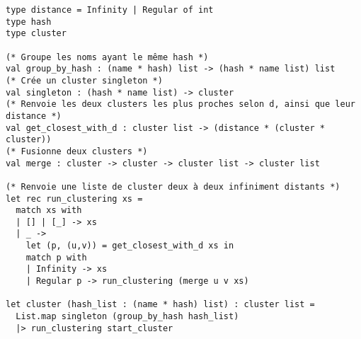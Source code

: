 \begin{verbatim}
type distance = Infinity | Regular of int
type hash
type cluster

(* Groupe les noms ayant le même hash *)
val group_by_hash : (name * hash) list -> (hash * name list) list
(* Crée un cluster singleton *)
val singleton : (hash * name list) -> cluster
(* Renvoie les deux clusters les plus proches selon d, ainsi que leur distance *)
val get_closest_with_d : cluster list -> (distance * (cluster * cluster))
(* Fusionne deux clusters *)
val merge : cluster -> cluster -> cluster list -> cluster list

(* Renvoie une liste de cluster deux à deux infiniment distants *)
let rec run_clustering xs =
  match xs with
  | [] | [_] -> xs
  | _ ->
    let (p, (u,v)) = get_closest_with_d xs in
    match p with
    | Infinity -> xs
    | Regular p -> run_clustering (merge u v xs)

let cluster (hash_list : (name * hash) list) : cluster list =
  List.map singleton (group_by_hash hash_list)
  |> run_clustering start_cluster
\end{verbatim}